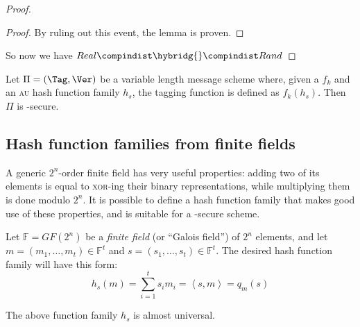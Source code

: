 \begin{proof}
\begin{proof}
        By ruling out this event, the lemma is proven.
    \end{proof}

     So now we have $Real \compindist \hybridg{} \compindist Rand$
\end{proof}

\begin{corollary}
    Let $\Pi = (\Tag, \Ver)$ be a variable length message \mac{} scheme where, given a \prf{} $f_k$ and an \textsc{au} hash function family $h_s$, the tagging function is defined as $f_k(h_s)$. Then $\Pi$ is \ufcma-secure.
\end{corollary}

\subsection{Hash function families from finite fields}


A generic $2^n$-order finite field has very useful properties: adding two of its elements is equal to \textsc{xor}-ing their binary representations, while multiplying them is done modulo $2^n$. It is possible to define a hash function family that makes good use of these properties, and is suitable for a \ufcma-secure \mac{} scheme.

\begin{construction}
    Let $\mathbb{F} = GF(2^n)$ be a \textit{finite field} (or ``Galois field'') of $2^n$ elements, and let $m = (m_1, \dots, m_t) \in \mathbb{F}^t$ and $s = (s_1, \dots, s_t) \in \mathbb{F}^t$. The desired hash function family will have this form:
    \[
        h_{s}(m)= \sum_{i = 1}^{t} s_i m_i = \left<s, m\right> = q_m(s)
    \]
\end{construction}

\begin{lemma}
    The above function family $h_s$ is almost universal.
\end{lemma}


